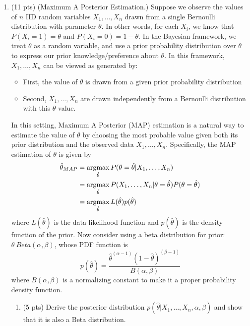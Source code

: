 \documentclass{article}
\def\argmax{\mathop{\rm argmax}}
\begin{document}
\begin{enumerate}
\item (11 pts) (Maximum A Posterior Estimation.)
Suppose we observe the values of $n$ IID random variables $X_1, \dots , X_n$ drawn from a single Bernoulli
distribution with parameter $\theta$. In other words, for each $X_i$, we know that $P(X_i = 1) =\theta$ and $P(X_i = 0) = 1- \theta$.
In the Bayesian framework, we treat $\theta$ as a random variable, and use a prior probability distribution over $\theta$ to express our prior knowledge/preference about $\theta$. In this framework,  $X_1, \dots, X_n$ can be viewed as generated by:
\begin{itemize}
\item First, the value of $\theta$ is drawn from a given prior probability distribution
\item Second, $X_1, \dots, X_n$ are drawn independently from a Bernoulli distribution with this $\theta$ value.
\end{itemize}
In this setting, Maximum A Posterior (MAP) estimation is a natural way to estimate the value of $\theta$ by choosing the most probable value given both its prior distribution and the observed data $X_1, \dots , X_n$. Specifically, the MAP estimation of $\theta$ is given by
\begin{align*}
\hat{\theta}_{MAP} & = \argmax_{\hat{\theta}}P(\theta=\hat{\theta}|X_1,\dots, X_n)\\
&=\argmax_{\hat{\theta}}P(X_1,\dots,X_n|\theta = \hat{\theta} )P(\theta=\hat{\theta})\\
& = \argmax_{\hat{\theta}}L(\hat{\theta})p(\hat{\theta})
\end{align*}
where $L(\hat{\theta})$ is the data likelihood function and $p(\hat{\theta})$ is the density function of the prior.  Now consider using a beta distribution for prior: $\theta ~ Beta(\alpha, \beta)$, whose PDF function is
\[p(\hat{\theta}) = \frac{\hat{\theta}^{(\alpha-1)}(1-\hat{\theta})^{(\beta-1)}}{B(\alpha, \beta)}\]
where $B(\alpha, \beta)$ is a normalizing constant to make it a proper probability density function.

\begin{enumerate}
\item (5 pts) Derive the posterior distribution $p(\hat{\theta}|X_1, \dots, X_n, \alpha, \beta)$ and show that it is also a Beta distribution.\\
\end{enumerate}
\end{enumerate}
\end{document}
